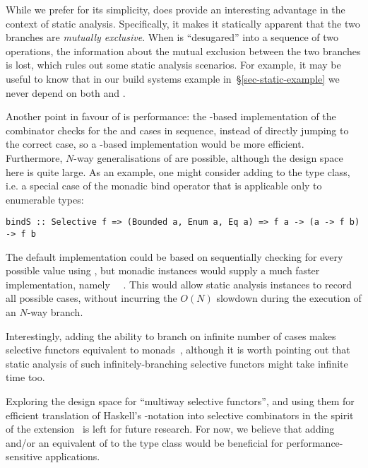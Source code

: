\noindent
While we prefer  for its simplicity,  does provide an
interesting advantage in the context of static analysis. Specifically, it makes
it statically apparent that the two branches are \emph{mutually exclusive}. When
 is ``desugared'' into a sequence of two  operations, the
information about the mutual exclusion between the two branches is lost, which
rules out some static analysis scenarios. For example, it may be useful to know
that in our build systems example in~\S\ref{sec-static-example} we never depend
on both  and .

Another point in favour of  is performance: the -based
implementation of the  combinator checks for the  and
 cases in sequence, instead of directly jumping to the correct case,
so a -based implementation would be more efficient. Furthermore,
$N$-way generalisations of  are possible, although the design space
here is quite large. As an example, one might consider adding  to the
 type class, i.e. a special case of the monadic bind operator that
is applicable only to enumerable types:

\vspace{1mm}
\begin{verbatim}
bindS :: Selective f => (Bounded a, Enum a, Eq a) => f a -> (a -> f b) -> f b
\end{verbatim}
\vspace{1mm}

\noindent
The default implementation could be based on sequentially checking for every
possible value using , but monadic instances would supply a much
faster implementation, namely ~\hs{=}~\hs{(>>=)}. This would allow
static analysis instances to record all possible cases, without incurring
the $O(N)$ slowdown during the execution of an $N$-way branch.

Interestingly, adding the ability to branch on infinite number of cases makes
selective functors equivalent to monads~\citep{peebles2013sigma}, although it is
worth pointing out that static analysis of such infinitely-branching selective
functors might take infinite time too.

Exploring the design space for ``multiway selective functors'', and using them
for efficient translation of Haskell's -notation into selective
combinators in the spirit of the 
extension~\citep{marlow2016applicativedo} is left for future research. For now,
we believe that adding  and/or an equivalent of  to the
 type class would be beneficial for performance-sensitive
applications.

